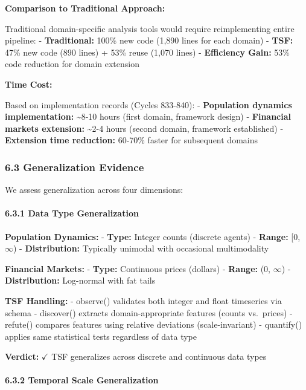 \documentclass[
]{article}
\begin{document}
\textbf{Comparison to Traditional Approach:}

Traditional domain-specific analysis tools would require reimplementing
entire pipeline: - \textbf{Traditional:} 100\% new code (1,890 lines for
each domain) - \textbf{TSF:} 47\% new code (890 lines) + 53\% reuse
(1,070 lines) - \textbf{Efficiency Gain:} 53\% code reduction for domain
extension

\textbf{Time Cost:}

Based on implementation records (Cycles 833-840): - \textbf{Population
dynamics implementation:} \textasciitilde8-10 hours (first domain,
framework design) - \textbf{Financial markets extension:}
\textasciitilde2-4 hours (second domain, framework established) -
\textbf{Extension time reduction:} 60-70\% faster for subsequent domains

\subsubsection{6.3 Generalization
Evidence}\label{generalization-evidence}

We assess generalization across four dimensions:

\paragraph{6.3.1 Data Type
Generalization}\label{data-type-generalization}

\textbf{Population Dynamics:} - \textbf{Type:} Integer counts (discrete
agents) - \textbf{Range:} {[}0, $\infty$) - \textbf{Distribution:} Typically
unimodal with occasional multimodality

\textbf{Financial Markets:} - \textbf{Type:} Continuous prices (dollars)
- \textbf{Range:} (0, $\infty$) - \textbf{Distribution:} Log-normal with fat
tails

\textbf{TSF Handling:} - observe() validates both integer and float
timeseries via schema - discover() extracts domain-appropriate features
(counts vs.~prices) - refute() compares features using relative
deviations (scale-invariant) - quantify() applies same statistical tests
regardless of data type

\textbf{Verdict:} $\checkmark$ TSF generalizes across discrete and continuous data
types

\paragraph{6.3.2 Temporal Scale
Generalization}\label{temporal-scale-generalization}
\end{document}
